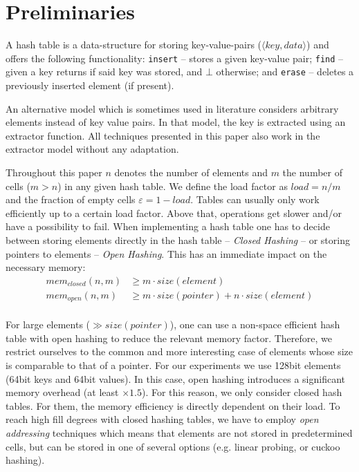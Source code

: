 \documentclass[a4paper,UKenglish]{lipics-v2016}
\begin{document}
\section{Preliminaries}
A hash table is a data-structure for storing key-value-pairs
($\langle key, data \rangle$) and offers the following functionality:
\verb~insert~ -- stores a given key-value pair; \verb~find~ -- given a
key returns if said key was stored, and $\bot$ otherwise; and
\verb~erase~ -- deletes a previously inserted element (if present).

An alternative model which is sometimes used in literature considers
arbitrary elements instead of key value pairs.  In that model, the key
is extracted using an extractor function.  All techniques presented in
this paper also work in the extractor model without any adaptation.

Throughout this paper $n$ denotes the number of elements and $m$ the
number of cells ($m > n$) in any given hash table.  We define the load
factor as $load = n/m$ and the fraction of empty cells $\varepsilon =
1-load$.  Tables can usually only work efficiently up to a certain
load factor.  Above that, operations get slower and/or have a
possibility to fail.  When implementing a hash table one has to decide
between storing elements directly in the hash table -- \emph{Closed
  Hashing} -- or storing pointers to elements -- \emph{Open
  Hashing}. This has an immediate impact on the necessary memory:
\begin{align*}
  mem_{closed}(n,m) &\geq m\cdot size(element)\\
  mem_{open}  (n,m) &\geq m\cdot size(pointer) + n\cdot size(element)\\
\end{align*}

For large elements ($\gg size(pointer)$), one can use a non-space
efficient hash table with open hashing to reduce the relevant memory
factor.  Therefore, we restrict ourselves to the common and more interesting case of
elements whose size is comparable to that of a pointer.  For our
experiments we use 128bit elements (64bit keys and 64bit values).  In
this case, open hashing introduces a significant memory
overhead (at least $\times1.5$). For this reason, we only consider closed
hash tables. For them, the
memory efficiency is directly dependent on their load.  To
reach high fill degrees with closed hashing tables, we have to employ
\emph{open addressing} techniques which means that elements are not
stored in predetermined cells, but can be stored in one of several
options (e.g. linear probing, or cuckoo hashing).
\end{document}
